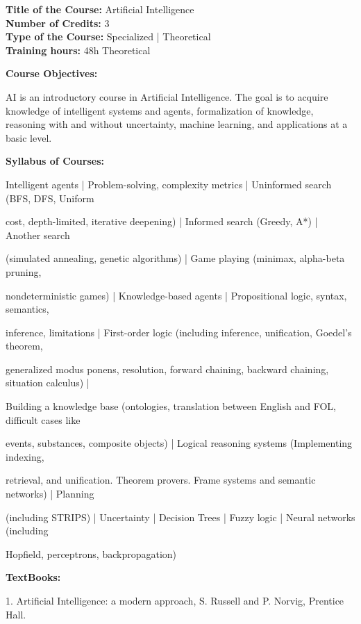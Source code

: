 \documentclass[12pt,a4paper]{article}
\begin{document}
\newpage
\textbf{Title of the Course:} Artificial Intelligence\\
\textbf{Number of Credits:} 3\\
\textbf{Type of the Course:} Specialized | Theoretical\\
\textbf{Training hours:} 48h Theoretical\par\vspace{4pt}
\textbf{Course Objectives:}\par\vspace{2pt}
AI is an introductory course in Artificial Intelligence. The goal is to acquire knowledge of
intelligent systems and agents, formalization of knowledge, reasoning with and without
uncertainty, machine learning, and applications at a basic level.\par\vspace{4pt}
\textbf{Syllabus of Courses:}\par\vspace{2pt}
Intelligent agents | Problem-solving, complexity metrics | Uninformed search (BFS, DFS, Uniform\par
cost, depth-limited, iterative deepening) | Informed search (Greedy, A*) | Another search\par
(simulated annealing, genetic algorithms) | Game playing (minimax, alpha-beta pruning,\par
nondeterministic games) | Knowledge-based agents | Propositional logic, syntax, semantics,\par
inference, limitations | First-order logic (including inference, unification, Goedel’s theorem,\par
generalized modus ponens, resolution, forward chaining, backward chaining, situation calculus) |\par
Building a knowledge base (ontologies, translation between English and FOL, difficult cases like\par
events, substances, composite objects) | Logical reasoning systems (Implementing indexing,\par
retrieval, and unification. Theorem provers. Frame systems and semantic networks) | Planning\par
(including STRIPS) | Uncertainty | Decision Trees | Fuzzy logic | Neural networks (including\par
Hopfield, perceptrons, backpropagation)\par\vspace{4pt}
\textbf{TextBooks:}\par\vspace{2pt}
1. Artificial Intelligence: a modern approach, S. Russell and P. Norvig, Prentice Hall.\par
\vspace{4pt}
\end{document}
